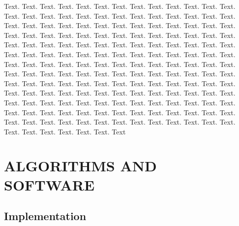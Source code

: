 \documentclass[a4,center,fleqn]{NAR}
\begin{document}
Text. Text. Text. Text. Text. Text.
Text. Text. Text. Text. Text. Text. Text. Text. Text. Text. Text.
Text. Text. Text. Text. Text. Text. Text. Text. Text. Text. Text.
Text. Text. Text. Text. Text. Text. Text. Text. Text. Text. Text.
Text. Text. Text. Text. Text. Text. Text. Text. Text. Text. Text.
Text. Text. Text. Text. Text. Text. Text. Text. Text. Text. Text.
Text. Text. Text. Text. Text. Text. Text. Text. Text. Text. Text.
Text. Text. Text. Text. Text. Text. Text. Text. Text. Text. Text.
Text. Text. Text. Text. Text. Text. Text. Text. Text. Text. Text.
Text. Text. Text. Text. Text. Text. Text. Text. Text. Text. Text.
Text. Text. Text. Text. Text. Text. Text. Text. Text. Text. Text.
Text. Text. Text. Text. Text. Text. Text. Text. Text. Text. Text.
Text. Text. Text. Text. Text. Text. Text. Text. Text. Text. Text.
Text. Text. Text. Text. Text. Text. Text. Text. Text. Text. Text.
Text. Text. Text. Text. Text. Text. Text. Text. Text. Text. Text.
Text. Text. Text. Text. Text. Text. Text. Text. Text. Text. Text.
Text. Text. Text. Text.
Text 

\section{ALGORITHMS AND SOFTWARE}

\subsection{Implementation}
\end{document}
